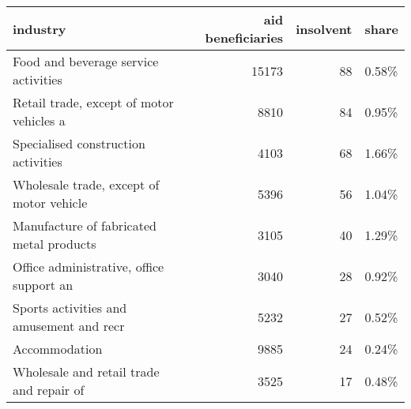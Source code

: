 \begin{tabular}{lrrl}
\toprule
                                industry &  aid beneficiaries &  insolvent & share \\
\midrule
    Food and beverage service activities &              15173 &         88 & 0.58\% \\
Retail trade, except of motor vehicles a &               8810 &         84 & 0.95\% \\
     Specialised construction activities &               4103 &         68 & 1.66\% \\
Wholesale trade, except of motor vehicle &               5396 &         56 & 1.04\% \\
Manufacture of fabricated metal products &               3105 &         40 & 1.29\% \\
Office administrative, office support an &               3040 &         28 & 0.92\% \\
Sports activities and amusement and recr &               5232 &         27 & 0.52\% \\
                           Accommodation &               9885 &         24 & 0.24\% \\
Wholesale and retail trade and repair of &               3525 &         17 & 0.48\% \\
\bottomrule
\end{tabular}
